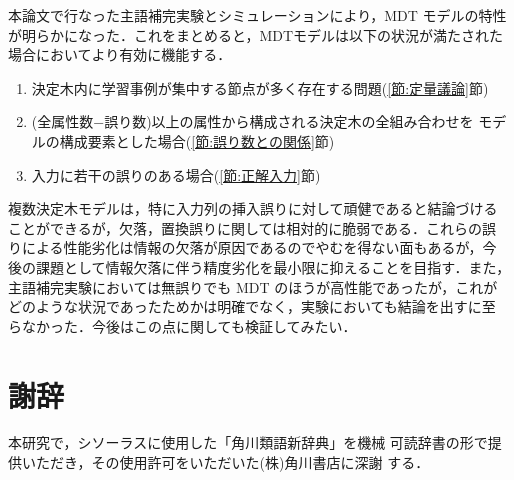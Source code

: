 本論文で行なった主語補完実験とシミュレーションにより，MDT モデルの特性
が明らかになった．これをまとめると，MDTモデルは以下の状況が満たされた
場合においてより有効に機能する．

\begin{enumerate}
\item 決定木内に学習事例が集中する節点が多く存在する問題(\ref{節:定量議論}節)
\item (全属性数−誤り数)以上の属性から構成される決定木の全組み合わせを
  モデルの構成要素とした場合(\ref{節:誤り数との関係}節)
\item 入力に若干の誤りのある場合(\ref{節:正解入力}節)
\end{enumerate}


複数決定木モデルは，特に入力列の挿入誤りに対して頑健であると結論づける
ことができるが，欠落，置換誤りに関しては相対的に脆弱である．これらの誤
りによる性能劣化は情報の欠落が原因であるのでやむを得ない面もあるが，今
後の課題として情報欠落に伴う精度劣化を最小限に抑えることを目指す．また，
主語補完実験においては無誤りでも MDT のほうが高性能であったが，これが
どのような状況であったためかは明確でなく，実験においても結論を出すに至
らなかった．今後はこの点に関しても検証してみたい．


\section*{謝辞}
本研究で，シソーラスに使用した「角川類語新辞典」\cite{角川類語}を機械
可読辞書の形で提供いただき，その使用許可をいただいた(株)角川書店に深謝
する．


